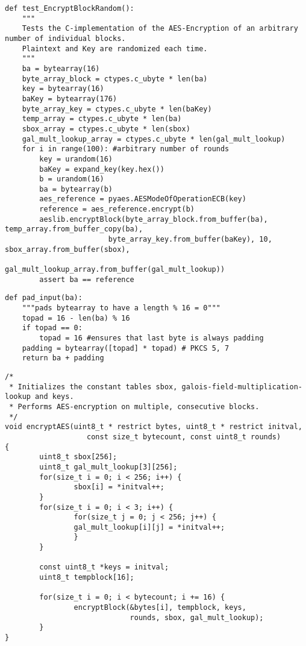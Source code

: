 \begin{lstlisting}
def test_EncryptBlockRandom():
    """
    Tests the C-implementation of the AES-Encryption of an arbitrary number of individual blocks.
    Plaintext and Key are randomized each time.
    """
    ba = bytearray(16)
    byte_array_block = ctypes.c_ubyte * len(ba)
    key = bytearray(16)
    baKey = bytearray(176)
    byte_array_key = ctypes.c_ubyte * len(baKey)
    temp_array = ctypes.c_ubyte * len(ba)
    sbox_array = ctypes.c_ubyte * len(sbox)
    gal_mult_lookup_array = ctypes.c_ubyte * len(gal_mult_lookup)
    for i in range(100): #arbitrary number of rounds
        key = urandom(16)
        baKey = expand_key(key.hex())
        b = urandom(16)
        ba = bytearray(b)
        aes_reference = pyaes.AESModeOfOperationECB(key)
        reference = aes_reference.encrypt(b)
        aeslib.encryptBlock(byte_array_block.from_buffer(ba), temp_array.from_buffer_copy(ba),
                        byte_array_key.from_buffer(baKey), 10, sbox_array.from_buffer(sbox),
                        gal_mult_lookup_array.from_buffer(gal_mult_lookup))
        assert ba == reference
\end{lstlisting}

\begin{lstlisting}
def pad_input(ba):
    """pads bytearray to have a length % 16 = 0"""
    topad = 16 - len(ba) % 16
    if topad == 0:
        topad = 16 #ensures that last byte is always padding
    padding = bytearray([topad] * topad) # PKCS 5, 7
    return ba + padding
\end{lstlisting}

\begin{lstlisting}
/*
 * Initializes the constant tables sbox, galois-field-multiplication-lookup and keys.
 * Performs AES-encryption on multiple, consecutive blocks.
 */
void encryptAES(uint8_t * restrict bytes, uint8_t * restrict initval, 
                   const size_t bytecount, const uint8_t rounds)
{   
        uint8_t sbox[256];
        uint8_t gal_mult_lookup[3][256];
        for(size_t i = 0; i < 256; i++) {
                sbox[i] = *initval++;
        }
        for(size_t i = 0; i < 3; i++) {
                for(size_t j = 0; j < 256; j++) {
                gal_mult_lookup[i][j] = *initval++;
                }
        }
        
        const uint8_t *keys = initval;
        uint8_t tempblock[16];
        
        for(size_t i = 0; i < bytecount; i += 16) {
                encryptBlock(&bytes[i], tempblock, keys, 
                             rounds, sbox, gal_mult_lookup);
        }
}
\end{lstlisting}

